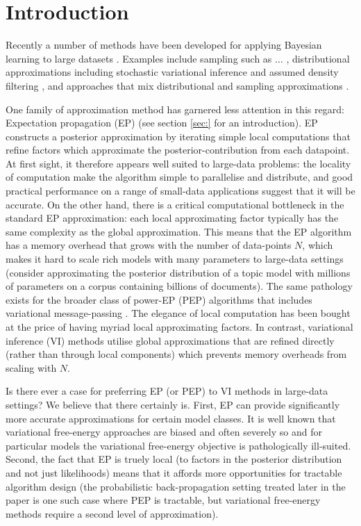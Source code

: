 \section{Introduction}

Recently a number of methods have been developed for applying Bayesian learning to large datasets . Examples include sampling such as ... \cite{adams}, distributional approximations including stochastic variational inference \cite{hoffman:svi} and assumed density filtering \cite{}, and approaches that mix distributional and sampling approximations \cite{gelman,teh}. 

One family of approximation method has garnered less attention in this regard: Expectation propagation (EP) \cite{minka:ep}\cite{opper:ec} (see section \ref{sec:} for an introduction). EP constructs a posterior approximation by iterating simple local computations that refine factors which approximate the posterior-contribution from each datapoint. At first sight, it therefore appears well suited to large-data problems: the locality of computation make the algorithm simple to parallelise and distribute, and good practical performance on a range of small-data applications suggest that it will be accurate\cite{kuss:gpep,barthelme:ep_likelihood,cunningham}. On the other hand, there is a critical computational bottleneck in the standard EP approximation: each local approximating factor typically has the same complexity as the global approximation. This means that the EP algorithm has a memory overhead that grows with the number of data-points $N$, which makes it hard to scale rich models with many parameters to large-data settings (consider approximating the posterior distribution of a topic model with millions of parameters on a corpus containing billions of documents). The same pathology exists for the broader class of power-EP (PEP) algorithms \cite{minka:pep} that includes variational message-passing \cite{winn:vmp}. The elegance of local computation has been bought at the price of having myriad local approximating factors. In contrast, variational inference (VI) methods \cite{jordan:variational,beal:variational} utilise global approximations that are refined directly (rather than through local components) which prevents memory overheads from scaling with $N$. 

Is there ever a case for preferring EP (or PEP) to VI methods in large-data settings?  We believe that there certainly is. First, EP can provide significantly more accurate approximations for certain model classes. It is well known that variational free-energy approaches are biased and often severely so \cite{turner+sahani:2011} and for particular models the variational free-energy objective is pathologically ill-suited\cite{cunningham,turner}. Second, the fact that EP is truely local (to factors in the posterior distribution and not just likelihoods) means that it affords more opportunities for tractable algorithm design (the probabilistic back-propagation setting treated later in the paper is one such case where PEP is tractable, but variational free-energy methods require a second level of approximation). 

